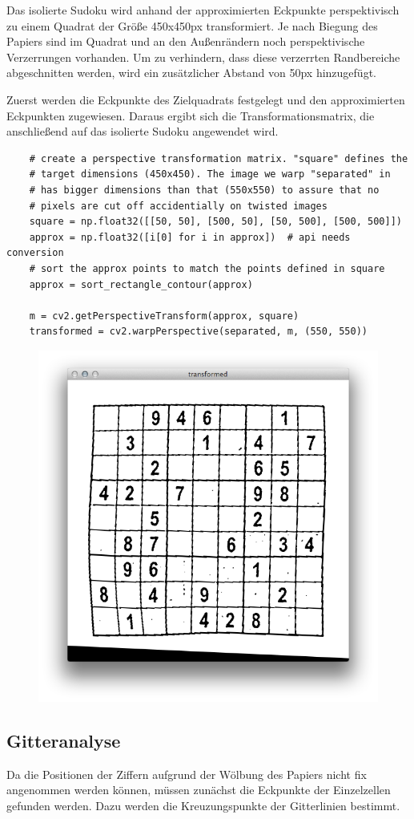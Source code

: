Das isolierte Sudoku wird anhand der approximierten Eckpunkte perspektivisch zu einem Quadrat der Größe 450x450px transformiert.
Je nach Biegung des Papiers sind im Quadrat und an den Außenrändern noch perspektivische Verzerrungen vorhanden. Um zu verhindern, dass diese verzerrten Randbereiche abgeschnitten werden, wird ein zusätzlicher Abstand von 50px hinzugefügt.

Zuerst werden die Eckpunkte des Zielquadrats festgelegt und den approximierten Eckpunkten zugewiesen. Daraus ergibt sich die Transformationsmatrix, die anschließend auf das isolierte Sudoku angewendet wird.

\begin{lstlisting}
    # create a perspective transformation matrix. "square" defines the
    # target dimensions (450x450). The image we warp "separated" in
    # has bigger dimensions than that (550x550) to assure that no
    # pixels are cut off accidentially on twisted images
    square = np.float32([[50, 50], [500, 50], [50, 500], [500, 500]])
    approx = np.float32([i[0] for i in approx])  # api needs conversion
    # sort the approx points to match the points defined in square
    approx = sort_rectangle_contour(approx)

    m = cv2.getPerspectiveTransform(approx, square)
    transformed = cv2.warpPerspective(separated, m, (550, 550))
\end{lstlisting}

\begin{figure}[H]
    \begin{center}
        \includegraphics[width=.5\textwidth]{Abbildungen/transformed}
    \end{center}
\end{figure}


\subsection{Gitteranalyse}
Da die Positionen der Ziffern aufgrund der Wölbung des Papiers nicht fix angenommen werden können, müssen zunächst die Eckpunkte der Einzelzellen gefunden werden.
Dazu werden die Kreuzungspunkte der Gitterlinien bestimmt.

